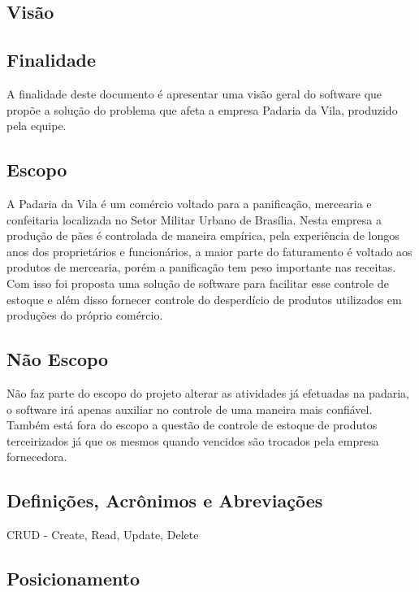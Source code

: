 \begin{appendices}
\chapter{Visão}

\section{Finalidade}
	A finalidade deste documento é apresentar uma visão geral do software que propõe a solução do problema que afeta a empresa Padaria da Vila, produzido pela equipe.

\section{Escopo}
	A Padaria da Vila é um comércio voltado para a panificação, mercearia e confeitaria localizada no Setor Militar Urbano de Brasília. Nesta empresa a produção de pães é controlada de maneira empírica, pela experiência de longos anos dos proprietários e funcionários, a maior parte do faturamento é voltado aos produtos de mercearia, porém a panificação tem peso importante nas receitas. Com isso foi proposta uma solução de software para facilitar esse controle de estoque e além disso fornecer controle do desperdício de produtos utilizados em produções do próprio comércio.


\section{Não Escopo}
	Não faz parte do escopo do projeto alterar as atividades já efetuadas na padaria, o software irá apenas auxiliar no controle de uma maneira mais confiável.
	Também está fora do escopo a questão de controle de estoque de produtos terceirizados já que os mesmos quando vencidos são trocados pela empresa fornecedora.

\section{Definições, Acrônimos e Abreviações}
	CRUD - Create, Read, Update, Delete

\section{Posicionamento}


\end{appendices}
